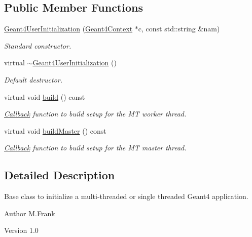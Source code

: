 \subsection*{Public Member Functions}
\begin{DoxyCompactItemize}
\item 
\hyperlink{class_d_d4hep_1_1_simulation_1_1_geant4_user_initialization_a247daa1d57d180bb14b7a46187cf0e27}{Geant4UserInitialization} (\hyperlink{class_d_d4hep_1_1_simulation_1_1_geant4_context}{Geant4Context} $\ast$c, const std::string \&nam)
\begin{DoxyCompactList}\small\item\em Standard constructor. \item\end{DoxyCompactList}\item 
virtual \hyperlink{class_d_d4hep_1_1_simulation_1_1_geant4_user_initialization_af2367d3c7707179e2809f9a94b42bf00}{$\sim$Geant4UserInitialization} ()
\begin{DoxyCompactList}\small\item\em Default destructor. \item\end{DoxyCompactList}\item 
virtual void \hyperlink{class_d_d4hep_1_1_simulation_1_1_geant4_user_initialization_a6313dbf2fcee89a5a9cb60d3cef4ba45}{build} () const 
\begin{DoxyCompactList}\small\item\em \hyperlink{class_d_d4hep_1_1_callback}{Callback} function to build setup for the MT worker thread. \item\end{DoxyCompactList}\item 
virtual void \hyperlink{class_d_d4hep_1_1_simulation_1_1_geant4_user_initialization_a382bfc9f7dd55d3c0c91f4bfbfefe1d0}{buildMaster} () const 
\begin{DoxyCompactList}\small\item\em \hyperlink{class_d_d4hep_1_1_callback}{Callback} function to build setup for the MT master thread. \item\end{DoxyCompactList}\end{DoxyCompactItemize}


\subsection{Detailed Description}
Base class to initialize a multi-\/threaded or single threaded Geant4 application. \begin{DoxyAuthor}{Author}
M.Frank 
\end{DoxyAuthor}
\begin{DoxyVersion}{Version}
1.0 
\end{DoxyVersion}



